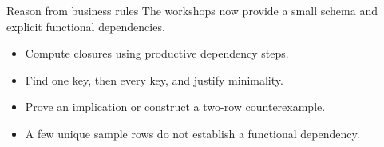 \begin{frame}[t]{Reason from business rules}
The workshops now provide a small schema and explicit functional dependencies.
\medskip
\begin{itemize}
\item Compute closures using productive dependency steps.
\item Find one key, then every key, and justify minimality.
\item Prove an implication or construct a two-row counterexample.
\item A few unique sample rows do not establish a functional dependency.
\end{itemize}
\end{frame}
